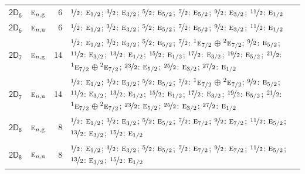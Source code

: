 \documentclass[10pt,a4paper]{article}
\numberwithin{equation}{section}
\newcommand{\grp}[1]{\mathsf{#1}}
\newcommand{\irr}[1]{\text{\normalfont\scshape #1}}
\newcommand{\conjpair}[1]{{}^{#1}}
\newcommand{\ptag}[1]{\mathrm{#1}}
\newlength{\fillwidth}\newlength{\cellwidth}\newlength{\colwidth}
\begin{document}
{\begin{longtable}{@{}llr>{\RaggedRight\arraybackslash}p{\fillwidth}@{}}
\href{2D6.pdf}{$\grp{2D_{6}}$} & $\irr{e}_{n,\ptag{g}}$ & 6 & $\nicefrac{1}{2}$: $\irr{e}_{1/2}$; $\nicefrac{3}{2}$: $\irr{e}_{3/2}$; $\nicefrac{5}{2}$: $\irr{e}_{5/2}$; $\nicefrac{7}{2}$: $\irr{e}_{5/2}$; $\nicefrac{9}{2}$: $\irr{e}_{3/2}$; $\nicefrac{11}{2}$: $\irr{e}_{1/2}$\\
\href{2D6.pdf}{$\grp{2D_{6}}$} & $\irr{e}_{n,\ptag{u}}$ & 6 & $\nicefrac{1}{2}$: $\irr{e}_{1/2}$; $\nicefrac{3}{2}$: $\irr{e}_{3/2}$; $\nicefrac{5}{2}$: $\irr{e}_{5/2}$; $\nicefrac{7}{2}$: $\irr{e}_{5/2}$; $\nicefrac{9}{2}$: $\irr{e}_{3/2}$; $\nicefrac{11}{2}$: $\irr{e}_{1/2}$\\
\href{2D7.pdf}{$\grp{2D_{7}}$} & $\irr{e}_{n,\ptag{g}}$ & 14 & $\nicefrac{1}{2}$: $\irr{e}_{1/2}$; $\nicefrac{3}{2}$: $\irr{e}_{3/2}$; $\nicefrac{5}{2}$: $\irr{e}_{5/2}$; $\nicefrac{7}{2}$: $\conjpair{1}\irr{e}_{7/2}$${}\oplus{}$$\conjpair{2}\irr{e}_{7/2}$; $\nicefrac{9}{2}$: $\irr{e}_{5/2}$; $\nicefrac{11}{2}$: $\irr{e}_{3/2}$; $\nicefrac{13}{2}$: $\irr{e}_{1/2}$; $\nicefrac{15}{2}$: $\irr{e}_{1/2}$; $\nicefrac{17}{2}$: $\irr{e}_{3/2}$; $\nicefrac{19}{2}$: $\irr{e}_{5/2}$; $\nicefrac{21}{2}$: $\conjpair{1}\irr{e}_{7/2}$${}\oplus{}$$\conjpair{2}\irr{e}_{7/2}$; $\nicefrac{23}{2}$: $\irr{e}_{5/2}$; $\nicefrac{25}{2}$: $\irr{e}_{3/2}$; $\nicefrac{27}{2}$: $\irr{e}_{1/2}$\\
\href{2D7.pdf}{$\grp{2D_{7}}$} & $\irr{e}_{n,\ptag{u}}$ & 14 & $\nicefrac{1}{2}$: $\irr{e}_{1/2}$; $\nicefrac{3}{2}$: $\irr{e}_{3/2}$; $\nicefrac{5}{2}$: $\irr{e}_{5/2}$; $\nicefrac{7}{2}$: $\conjpair{1}\irr{e}_{7/2}$${}\oplus{}$$\conjpair{2}\irr{e}_{7/2}$; $\nicefrac{9}{2}$: $\irr{e}_{5/2}$; $\nicefrac{11}{2}$: $\irr{e}_{3/2}$; $\nicefrac{13}{2}$: $\irr{e}_{1/2}$; $\nicefrac{15}{2}$: $\irr{e}_{1/2}$; $\nicefrac{17}{2}$: $\irr{e}_{3/2}$; $\nicefrac{19}{2}$: $\irr{e}_{5/2}$; $\nicefrac{21}{2}$: $\conjpair{1}\irr{e}_{7/2}$${}\oplus{}$$\conjpair{2}\irr{e}_{7/2}$; $\nicefrac{23}{2}$: $\irr{e}_{5/2}$; $\nicefrac{25}{2}$: $\irr{e}_{3/2}$; $\nicefrac{27}{2}$: $\irr{e}_{1/2}$\\
\href{2D8.pdf}{$\grp{2D_{8}}$} & $\irr{e}_{n,\ptag{g}}$ & 8 & $\nicefrac{1}{2}$: $\irr{e}_{1/2}$; $\nicefrac{3}{2}$: $\irr{e}_{3/2}$; $\nicefrac{5}{2}$: $\irr{e}_{5/2}$; $\nicefrac{7}{2}$: $\irr{e}_{7/2}$; $\nicefrac{9}{2}$: $\irr{e}_{7/2}$; $\nicefrac{11}{2}$: $\irr{e}_{5/2}$; $\nicefrac{13}{2}$: $\irr{e}_{3/2}$; $\nicefrac{15}{2}$: $\irr{e}_{1/2}$\\
\href{2D8.pdf}{$\grp{2D_{8}}$} & $\irr{e}_{n,\ptag{u}}$ & 8 & $\nicefrac{1}{2}$: $\irr{e}_{1/2}$; $\nicefrac{3}{2}$: $\irr{e}_{3/2}$; $\nicefrac{5}{2}$: $\irr{e}_{5/2}$; $\nicefrac{7}{2}$: $\irr{e}_{7/2}$; $\nicefrac{9}{2}$: $\irr{e}_{7/2}$; $\nicefrac{11}{2}$: $\irr{e}_{5/2}$; $\nicefrac{13}{2}$: $\irr{e}_{3/2}$; $\nicefrac{15}{2}$: $\irr{e}_{1/2}$\\

\end{longtable}}
\end{document}
